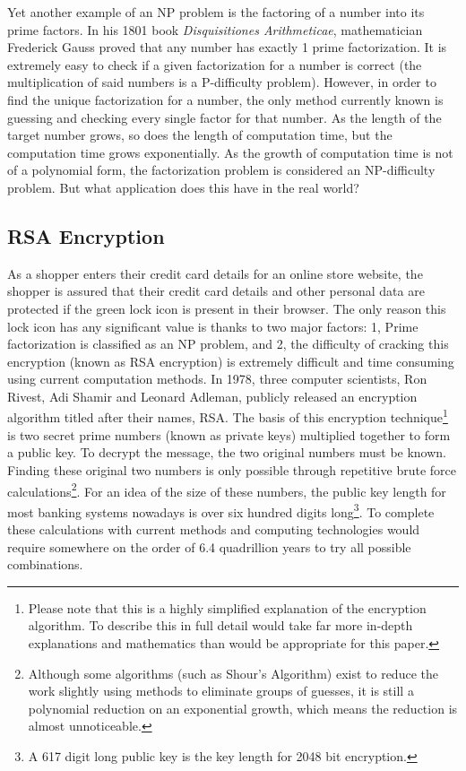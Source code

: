 \documentclass[10pt,journal,compsoc]{IEEEtran}
\begin{document}
Yet another example of an NP problem is the factoring of a number into its prime factors. In his 1801 book \textit{Disquisitiones Arithmeticae}, mathematician Frederick Gauss proved that any number has exactly 1 prime factorization. It is extremely easy to check if a given factorization for a number is correct (the multiplication of said numbers is a P-difficulty problem). However, in order to find the unique factorization for a number, the only method currently known is guessing and checking every single factor for that number. As the length of the target number grows, so does the length of computation time, but the computation time grows exponentially. As the growth of computation time is not of a polynomial form, the factorization problem is considered an NP-difficulty problem. But what application does this have in the real world?

\subsection{RSA Encryption}
As a shopper enters their credit card details for an online store website, the shopper is assured that their credit card details and other personal data are protected if the green lock icon is present in their browser. The only reason this lock icon has any significant value is thanks to two major factors: 1, Prime factorization is classified as an NP problem, and 2, the difficulty of cracking this encryption (known as RSA encryption) is extremely difficult and time consuming using current computation methods. In 1978, three computer scientists, Ron Rivest, Adi Shamir and Leonard Adleman, publicly released an encryption algorithm titled after their names, RSA. The basis of this encryption technique\footnote{Please note that this is a highly simplified explanation of the encryption algorithm. To describe this in full detail would take far more in-depth explanations and mathematics than would be appropriate for this paper.} is two secret prime numbers (known as private keys) multiplied together to form a public key. To decrypt the message, the two original numbers must be known. Finding these original two numbers is only possible through repetitive brute force calculations\footnote{Although  some algorithms (such as Shour's Algorithm) exist to reduce the work slightly using methods to eliminate groups of guesses, it is still a polynomial reduction on an exponential growth, which means the reduction is almost unnoticeable.}. For an idea of the size of these numbers, the public key length for most banking systems nowadays is over six hundred digits long\footnote{A 617 digit long public key is the key length for 2048 bit encryption.}. To complete these calculations with current  methods and computing technologies  would require somewhere on the order of 6.4 quadrillion years to try all possible combinations. 
\end{document}
